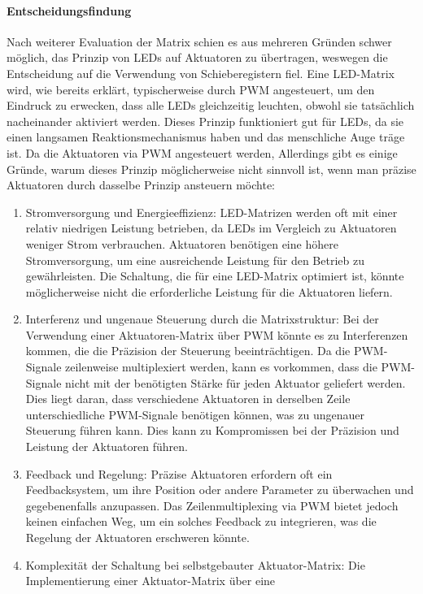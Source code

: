 \begin{enumerate}
\paragraph{Entscheidungsfindung}
Nach weiterer Evaluation der Matrix schien es aus mehreren Gründen schwer möglich, das Prinzip von LEDs auf Aktuatoren
zu übertragen, weswegen die Entscheidung auf die Verwendung von Schieberegistern fiel. \newline
Eine LED-Matrix wird, wie bereits erklärt,
typischerweise durch PWM angesteuert, um den Eindruck zu erwecken, dass alle
LEDs gleichzeitig leuchten, obwohl sie tatsächlich nacheinander aktiviert werden. Dieses Prinzip funktioniert gut für LEDs,
da sie einen langsamen Reaktionsmechanismus haben und das menschliche Auge träge ist. Da die Aktuatoren via PWM
angesteuert werden,
Allerdings gibt es einige Gründe,
warum dieses Prinzip möglicherweise nicht sinnvoll ist, wenn man präzise Aktuatoren durch dasselbe Prinzip ansteuern
möchte:
\begin{enumerate}
	\item Stromversorgung und Energieeffizienz: LED-Matrizen werden oft mit einer relativ niedrigen Leistung betrieben, da
	LEDs im Vergleich zu Aktuatoren weniger Strom verbrauchen. Aktuatoren benötigen eine höhere Stromversorgung,
	um eine ausreichende Leistung für den Betrieb zu gewährleisten. Die Schaltung, die für eine LED-Matrix optimiert ist,
	könnte möglicherweise nicht die erforderliche Leistung für die Aktuatoren liefern.
	\item Interferenz und ungenaue Steuerung durch die Matrixstruktur: Bei der Verwendung einer Aktuatoren-Matrix über PWM
	könnte es zu Interferenzen kommen, die die Präzision der Steuerung beeinträchtigen. Da die PWM-Signale zeilenweise
	multiplexiert werden, kann es vorkommen, dass die PWM-Signale nicht mit der benötigten Stärke für jeden Aktuator geliefert
	werden. Dies liegt daran, dass verschiedene Aktuatoren in derselben Zeile unterschiedliche PWM-Signale benötigen können,
	was zu ungenauer Steuerung führen kann. Dies kann zu Kompromissen bei der Präzision und Leistung der Aktuatoren führen.
	\item Feedback und Regelung: Präzise Aktuatoren erfordern oft ein Feedbacksystem, um ihre Position oder andere Parameter
	zu überwachen und gegebenenfalls anzupassen. Das Zeilenmultiplexing via PWM bietet jedoch keinen einfachen Weg, um ein
	solches Feedback zu integrieren, was die Regelung der Aktuatoren erschweren könnte.
	\item Komplexität der Schaltung bei selbstgebauter Aktuator-Matrix: Die Implementierung einer Aktuator-Matrix über eine

\end{enumerate}
\end{enumerate}
